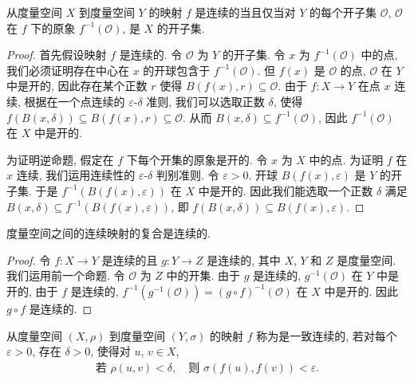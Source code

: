 \documentclass[../../main.tex]{subfiles}
\begin{document}
\begin{proposition}\label{proposition:ch09-连续映射开集原像}
从度量空间 $X$ 到度量空间 $Y$ 的映射 $f$ 是连续的当且仅当对 $Y$ 的每个开子集 $\mathcal{O}$, $\mathcal{O}$ 在 $f$ 下的原象 $f^{-1}(\mathcal{O})$, 是 $X$ 的开子集.
\end{proposition}

\begin{proof}
首先假设映射 $f$ 是连续的. 令 $\mathcal{O}$ 为 $Y$ 的开子集. 令 $x$ 为 $f^{-1}(\mathcal{O})$ 中的点, 我们必须证明存在中心在 $x$ 的开球包含于 $f^{-1}(\mathcal{O})$. 但 $f(x)$ 是 $\mathcal{O}$ 的点, $\mathcal{O}$ 在 $Y$ 中是开的, 因此存在某个正数 $r$ 使得 $B(f(x),r)\subseteq\mathcal{O}$. 由于 $f:X\to Y$ 在点 $x$ 连续, 根据在一个点连续的 $\varepsilon$-$\delta$ 准则, 我们可以选取正数 $\delta$, 使得 $f(B(x,\delta))\subseteq B(f(x),r)\subseteq\mathcal{O}$. 从而 $B(x,\delta)\subseteq f^{-1}(\mathcal{O})$, 因此 $f^{-1}(\mathcal{O})$ 在 $X$ 中是开的.

为证明逆命题, 假定在 $f$ 下每个开集的原象是开的. 令 $x$ 为 $X$ 中的点. 为证明 $f$ 在 $x$ 连续, 我们运用连续性的 $\varepsilon$-$\delta$ 判别准则. 令 $\varepsilon>0$. 开球 $B(f(x),\varepsilon)$ 是 $Y$ 的开子集. 于是 $f^{-1}(B(f(x),\varepsilon))$ 在 $X$ 中是开的. 因此我们能选取一个正数 $\delta$ 满足 $B(x,\delta)\subseteq f^{-1}(B(f(x),\varepsilon))$, 即 $f(B(x,\delta))\subseteq B(f(x),\varepsilon)$.
\end{proof}

\begin{proposition}\label{proposition:ch09-连续映射复合}
度量空间之间的连续映射的复合是连续的.
\end{proposition}

\begin{proof}
令 $f:X\to Y$ 是连续的且 $g:Y\to Z$ 是连续的, 其中 $X$, $Y$ 和 $Z$ 是度量空间. 我们运用前一个命题. 令 $\mathcal{O}$ 为 $Z$ 中的开集. 由于 $g$ 是连续的, $g^{-1}(\mathcal{O})$ 在 $Y$ 中是开的, 由于 $f$ 是连续的, $f^{-1}(g^{-1}(\mathcal{O}))=(g\circ f)^{-1}(\mathcal{O})$ 在 $X$ 中是开的. 因此 $g\circ f$ 是连续的.
\end{proof}

\begin{definition}[一致连续]\label{definition:ch09-一致连续}
从度量空间 $(X,\rho)$ 到度量空间 $(Y,\sigma)$ 的映射 $f$ 称为是一致连续的, 若对每个 $\varepsilon>0$, 存在 $\delta>0$, 使得对 $u$, $v\in X$,
\begin{align*}
\text{若 }\rho(u,v)<\delta,\quad\text{则 }\sigma(f(u),f(v))<\varepsilon.
\end{align*}
\end{definition}
\end{document}
